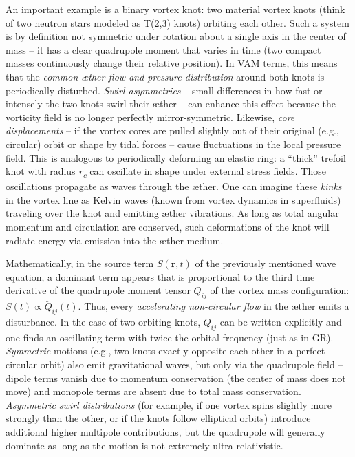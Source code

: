 An important example is a binary vortex knot: two material vortex knots (think of two neutron stars modeled as T(2,3) knots) orbiting each other. Such a system is by definition not symmetric under rotation about a single axis in the center of mass – it has a clear quadrupole moment that varies in time (two compact masses continuously change their relative position). In VAM terms, this means that the \textit{common æther flow and pressure distribution} around both knots is periodically disturbed. \textit{Swirl asymmetries} – small differences in how fast or intensely the two knots swirl their æther – can enhance this effect because the vorticity field is no longer perfectly mirror-symmetric. Likewise, \textit{core displacements} – if the vortex cores are pulled slightly out of their original (e.g., circular) orbit or shape by tidal forces – cause fluctuations in the local pressure field. This is analogous to periodically deforming an elastic ring: a “thick” trefoil knot with radius \textit{r\textsubscript{c}} can oscillate in shape under external stress fields. Those oscillations propagate as waves through the æther. One can imagine these \textit{kinks} in the vortex line as Kelvin waves (known from vortex dynamics in superfluids) traveling over the knot and emitting æther vibrations. As long as total angular momentum and circulation are conserved, such deformations of the knot will radiate energy via emission into the æther medium.

Mathematically, in the source term $S(\mathbf{r},t)$ of the previously mentioned wave equation, a dominant term appears that is proportional to the third time derivative of the quadrupole moment tensor $Q_{ij}$ of the vortex mass configuration: $S(t) \propto \dddot{Q}_{ij}(t)$. Thus, every \textit{accelerating non-circular flow} in the æther emits a disturbance. In the case of two orbiting knots, $Q_{ij}$ can be written explicitly and one finds an oscillating term with twice the orbital frequency (just as in GR). \textit{Symmetric} motions (e.g., two knots exactly opposite each other in a perfect circular orbit) also emit gravitational waves, but only via the quadrupole field – dipole terms vanish due to momentum conservation (the center of mass does not move) and monopole terms are absent due to total mass conservation. \textit{Asymmetric swirl distributions} (for example, if one vortex spins slightly more strongly than the other, or if the knots follow elliptical orbits) introduce additional higher multipole contributions, but the quadrupole will generally dominate as long as the motion is not extremely ultra-relativistic.

